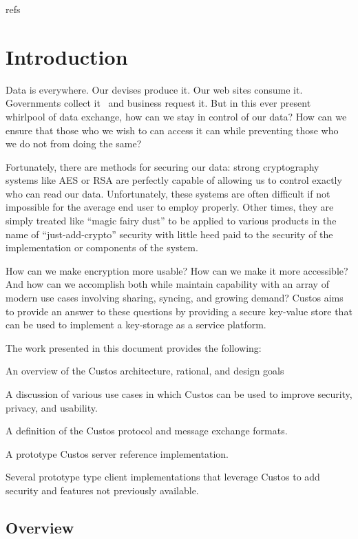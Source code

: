 refs\chapter{Introduction}
\label{chap:intro}

Data is everywhere. Our devises produce it. Our web sites consume
it. Governments collect it~\cite{GreenwaldPrism} and business request
it. But in this ever present whirlpool of data exchange, how can we
stay in control of our data? How can we ensure that those who we wish
to can access it can while preventing those who we do not from doing
the same?

Fortunately, there are methods for securing our data: strong
cryptography systems like AES or RSA are perfectly capable of allowing
us to control exactly who can read our data. Unfortunately, these
systems are often difficult if not impossible for the average end user
to employ properly. Other times, they are simply treated like ``magic
fairy dust'' to be applied to various products in the name of
``just-add-crypto'' security with little heed paid to the security of
the implementation or components of the system.

How can we make encryption more usable? How can we make it more
accessible? And how can we accomplish both while maintain capability
with an array of modern use cases involving sharing, syncing, and
growing demand? Custos aims to provide an answer to these questions by
providing a secure key-value store that can be used to implement a
key-storage as a service platform.

The work presented in this document provides the following:

\begin{packed_item}
\item An overview of the Custos architecture, rational, and design goals
\item A discussion of various use cases in which Custos can be used to
  improve security, privacy, and usability.
\item A definition of the Custos protocol and message exchange formats.
\item A prototype Custos server reference implementation.
\item Several prototype type client implementations that leverage Custos to
  add security and features not previously available.
\end{packed_item}

\section{Overview}

